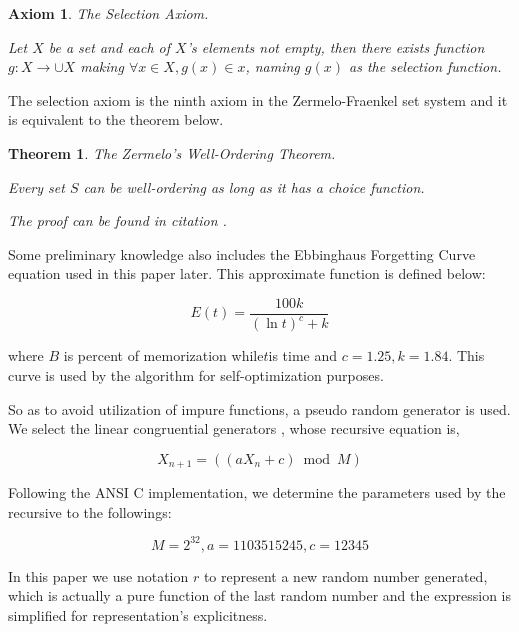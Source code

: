 \documentclass[preprint]{elsarticle}
\newtheorem{theorem}{Theorem}	%
\newtheorem{axiom}{Axiom}	%
\numberwithin{theorem}{section}	%
\numberwithin{axiom}{section}	%
\numberwithin{definition}{section}	%
\begin{document}
\begin{axiom}
	The Selection Axiom.
	
	Let \(X\) be a set and each of \(X\){'}s elements not empty, then there exists function \(g:X\to \cup X\) making \(\forall x\in X,g(x)\in x\), naming \(g(x)\) as the selection function.
\end{axiom}

The selection axiom is the ninth axiom in the Zermelo-Fraenkel set system and it is equivalent to the theorem below.

\begin{theorem}
	The Zermelo{'}s Well-Ordering Theorem.\cite{Li2019}
	
	Every set \(S\) can be well-ordering as long as it has a choice function.
	
	The proof can be found in citation \cite{Li2019}.
\end{theorem}

Some preliminary knowledge also includes the Ebbinghaus Forgetting Curve equation \cite{Ebbinghaus1913} used in this paper later. This approximate function is defined below:

\begin{equation*}
	E(\mathit{t})=\frac{100 k}{(\ln  t)^c+k}
\end{equation*}

\noindent where \(B\) is percent of memorization while\(t\)is time and \(c=1.25,k=1.84\). This curve is used by the algorithm for self-optimization purposes.

So as to avoid utilization of impure functions, a pseudo random generator is used. We select the linear congruential generators \cite{Entacher1997}, whose recursive equation is,

\begin{equation*}
	X_{n+1}=(\left(a X_n+c\right) \bmod M)
\end{equation*}

Following the ANSI C implementation, we determine the parameters used by the recursive to the followings:

\begin{equation*}
	M=2^{32},a=1103515245, c=12345
\end{equation*}

In this paper we use notation \(\mathit{r}\) to represent a new random number generated, which is actually a pure function of the last random number and the expression is simplified for representation{'}s explicitness.
\end{document}
